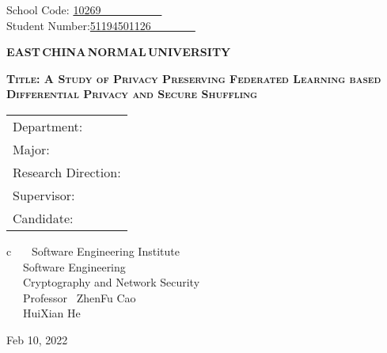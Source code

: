 \newpage

\pagestyle{empty}

\hskip 1.4cm {School Code: \underline{10269~~~~~~~~~~~\qquad}}\\
\hspace*{\fill} {Student Number:\underline{51194501126~~~~~~~~}}
\vskip 2cm

\begin{center}
{\Huge \bf EAST\,CHINA\,NORMAL\,UNIVERSITY}
\end{center}

\vskip 3cm

\begin{center}
{\huge \bf \scshape Title: A Study of Privacy Preserving Federated Learning based Differential Privacy and Secure Shuffling}
\end{center}

\vskip 2cm {\large
\begin{center}
\begin{tabular}{l}
Department:\\
Major:\\
Research Direction:\\
Supervisor:\\
Candidate:
\end{tabular}
\begin{tabular}c
~~~Software Engineering Institute\\
\hline ~~~Software Engineering  \\
\hline ~~~Cryptography and Network Security\\
\hline ~~~Professor ~ZhenFu Cao~  \\
\hline ~~~HuiXian He  \\
\hline
\end{tabular}
\end{center}}

\vskip 30mm

\begin{center}
{\Large Feb 10, 2022}
\end{center}
